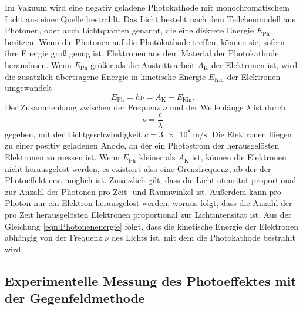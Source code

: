     Im Vakuum wird eine negativ geladene Photokathode mit monochromatischem Licht aus einer Quelle bestrahlt.
    Das Licht besteht nach dem Teilchenmodell aus Photonen,
    oder auch Lichtquanten genannt,
    die eine diskrete Energie $E_\text{Ph}$ besitzen.
    Wenn die Photonen auf die Photokathode treffen,
    können sie,
    sofern ihre Energie groß genug ist,
    Elektronen aus dem Material der Photokathode herauslösen.
    Wenn $E_\text{Ph}$ größer als die Austrittsarbeit $A_\text{K}$ der Elektronen ist,
    wird die zusätzlich übertragene Energie in kinetische Energie $E_\text{Kin}$ der Elektronen umgewandelt
    \begin{equation}
        E_\text{Ph} = h \nu = A_\text{K} + E_\text{Kin} . \label{eqn:Photonenenergie}
    \end{equation}
    Der Zusammenhang zwischen der Frequenz $\nu$ und der Wellenlänge $\lambda$ ist durch
    \begin{equation*}
        \nu = \frac{c}{\lambda}
    \end{equation*}
    gegeben,
    mit der Lichtgeschwindigkeit $c = \SI{3e8}{\meter\per\second}$.
    Die Elektronen fliegen zu einer positiv geladenen Anode,
    an der ein Photostrom der herausgelösten Elektronen zu messen ist.
    Wenn $E_\text{Ph}$ kleiner als $A_\text{K}$ ist,
    können die Elektronen nicht herausgelöst werden,
    es existiert also eine Grenzfrequenz,
    ab der der Photoeffekt erst möglich ist.
    Zusätzlich gilt,
    dass die Lichtintensität proportional zur Anzahl der Photonen pro Zeit- und Raumwinkel ist.
    Außerdem kann pro Photon nur ein Elektron herausgelöst werden,
    woraus folgt,
    dass die Anzahl der pro Zeit herausgelösten Elektronen proportional zur Lichtintensität ist.
    Aus der Gleichung \eqref{eqn:Photonenenergie} folgt,
    dass die kinetische Energie der Elektronen abhängig von der Frequenz $\nu$ des Lichts ist,
    mit dem die Photokathode bestrahlt wird.

\subsection{Experimentelle Messung des Photoeffektes mit der Gegenfeldmethode} \label{sec:zweizwei}

